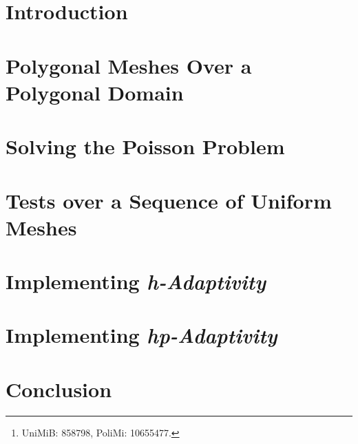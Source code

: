 \documentclass[12pt, twoside]{article}
\title{\reporttitle}
\author{Andrea Di Antonio\footnote{UniMiB: 858798, PoliMi: 10655477.}} %
\date{Exam session of July, 2024 \\ Academic Year 2023-24}
\begin{document}
	\maketitle
	\thispagestyle{fancy}

	\begin{abstract}
		\begin{center}
			This report details the implementation of the \textit{hp-adaptive} discontinuous Galërkin method, as part of the course \textit{Advanced Programming for Scientific Computing}. It covers key aspects including mesh generation, problem solving, and the integration of \textit{hp-adaptivity}. For technical details, refer to the project repository on \href{https://github.com/diantonioandrea/pacs-project}{GitHub}.
		\end{center}
	\end{abstract}

	\newpage
	\tableofcontents

	\newpage
    \section{Introduction}
	

	\newpage
    \section{Polygonal Meshes Over a Polygonal Domain}
	

	\newpage
    \section{Solving the Poisson Problem}
	

	\newpage
    \section{Tests over a Sequence of Uniform Meshes}
	

	\newpage
    \section{Implementing \textit{h-Adaptivity}}
	

	\newpage
    \section{Implementing \textit{hp-Adaptivity}}
	

	\newpage
    \section{Conclusion}
	

	\newpage
	
	
\end{document}
